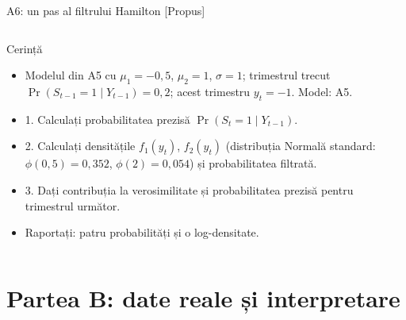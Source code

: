 \begin{frame}{A6: un pas al filtrului Hamilton [Propus]}
\propsub
\itemsize{\scriptsize}
\begin{columns}[T]
\begin{column}{\taskw}
\begin{block}{Cerință}
\begin{itemize}
    \item Modelul din A5 cu $\mu_1 = -0{,}5$, $\mu_2 = 1$, $\sigma = 1$; trimestrul trecut $\Pr(S_{t-1} = 1 \mid Y_{t-1}) = 0{,}2$; acest trimestru $y_t = -1$. Model: A5.
    \item 1. Calculați probabilitatea prezisă $\Pr(S_t = 1 \mid Y_{t-1})$.
    \item 2. Calculați densitățile $f_1(y_t)$, $f_2(y_t)$ (distribuția Normală standard: $\phi(0{,}5) = 0{,}352$, $\phi(2) = 0{,}054$) și probabilitatea filtrată.
    \item 3. Dați contribuția la verosimilitate și probabilitatea prezisă pentru trimestrul următor.
    \item Raportați: patru probabilități și o log-densitate.
\end{itemize}
\end{block}
\end{column}
\begin{column}{\solw}
\end{column}
\end{columns}
\end{frame}


\section{Partea B: date reale și interpretare}

